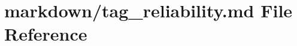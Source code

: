 \hypertarget{tag__reliability_8md}{}\section{markdown/tag\+\_\+reliability.md File Reference}
\label{tag__reliability_8md}
